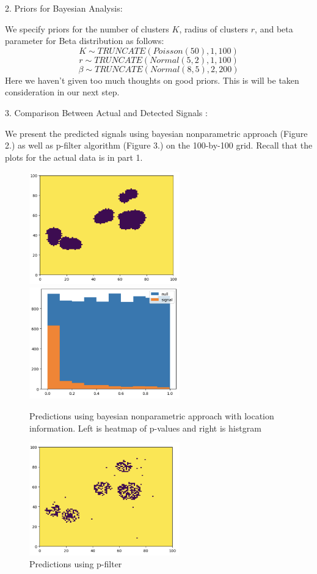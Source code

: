 \documentclass[12pt]{article}
\begin{document}
\vspace{1em}
2. Priors for Bayesian Analysis: 

We specify priors for the number of clusters $K$, radius of clusters $r$, and beta parameter for Beta distribution as follows: \\
$$K \sim TRUNCATE ( Poisson(50), 1, 100 )$$
$$r \sim TRUNCATE ( Normal(5, 2), 1, 100 )$$
$$\beta \sim TRUNCATE ( Normal(8, 5), 2, 200 )$$
Here we haven't given too much thoughts on good priors. This is will be taken consideration in our next step.

\vspace{1em}
3. Comparison Between Actual and Detected Signals : 

We present the predicted signals using bayesian nonparametric approach (Figure 2.) as well as p-filter algorithm (Figure 3.) on the 100-by-100 grid. Recall that the plots for the actual data is in part 1.
\begin{figure}[h]
\caption{Predictions using bayesian nonparametric approach with location information. Left is heatmap of p-values and right is histgram}
\includegraphics[width=6.5cm]{baygrid}
\includegraphics[width=6.5cm]{bayhist}
\end{figure}

\begin{figure}[h]
\caption{Predictions using p-filter}
\includegraphics[width=6.5cm]{pfiltergrid}
\end{figure}
\end{document}

